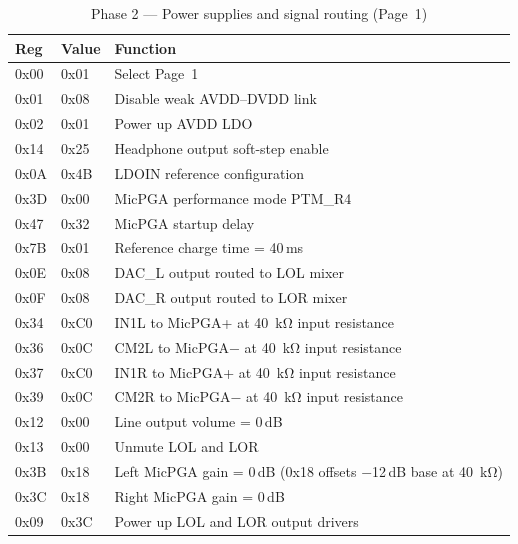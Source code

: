 \begin{table}[H]
    \centering
    \caption{Phase 2 — Power supplies and signal routing (Page~1)}
    \label{tab:codec-regs-p1}
    \small
    \begin{tabular}{llp{9cm}}
        \toprule
        \textbf{Reg} & \textbf{Value} & \textbf{Function} \\
        \midrule
        0x00 & 0x01 & Select Page~1 \\
        0x01 & 0x08 & Disable weak AVDD–DVDD link \\
        0x02 & 0x01 & Power up AVDD LDO \\
        0x14 & 0x25 & Headphone output soft-step enable \\
        0x0A & 0x4B & LDOIN reference configuration \\
        0x3D & 0x00 & MicPGA performance mode PTM\_R4 \\
        0x47 & 0x32 & MicPGA startup delay \\
        0x7B & 0x01 & Reference charge time = 40\,ms \\
        \midrule
        0x0E & 0x08 & DAC\_L output routed to LOL mixer \\
        0x0F & 0x08 & DAC\_R output routed to LOR mixer \\
        0x34 & 0xC0 & IN1L to MicPGA+ at \SI{40}{\kilo\ohm} input resistance \\
        0x36 & 0x0C & CM2L to MicPGA$-$ at \SI{40}{\kilo\ohm} input resistance \\
        0x37 & 0xC0 & IN1R to MicPGA+ at \SI{40}{\kilo\ohm} input resistance \\
        0x39 & 0x0C & CM2R to MicPGA$-$ at \SI{40}{\kilo\ohm} input resistance \\
        0x12 & 0x00 & Line output volume = 0\,dB \\
        0x13 & 0x00 & Unmute LOL and LOR \\
        0x3B & 0x18 & Left MicPGA gain = 0\,dB (0x18 offsets $-$12\,dB base at \SI{40}{\kilo\ohm}) \\
        0x3C & 0x18 & Right MicPGA gain = 0\,dB \\
        0x09 & 0x3C & Power up LOL and LOR output drivers \\
        \bottomrule
    \end{tabular}
\end{table}

